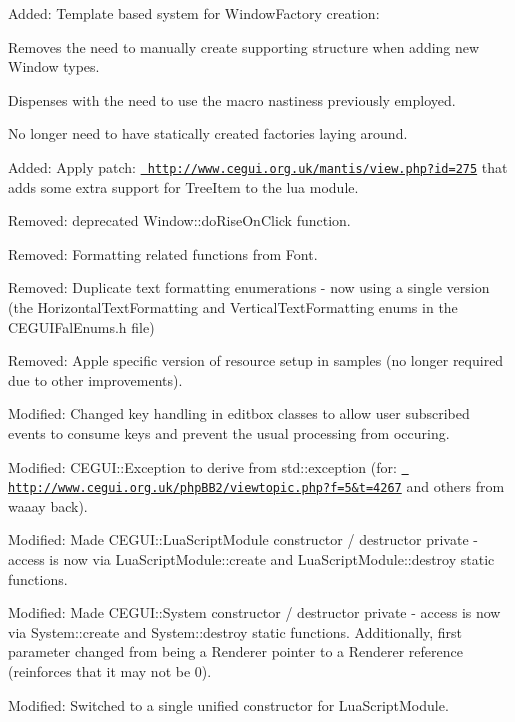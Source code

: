 \begin{DoxyItemize}
\item Added\+: Template based system for Window\+Factory creation\+:
\begin{DoxyItemize}
\item Removes the need to manually create supporting structure when adding new Window types.
\item Dispenses with the need to use the macro nastiness previously employed.
\item No longer need to have statically created factories laying around.
\end{DoxyItemize}
\item Added\+: Apply patch\+: \href{http://www.cegui.org.uk/mantis/view.php?id=275}{\texttt{ http\+://www.\+cegui.\+org.\+uk/mantis/view.\+php?id=275}} that adds some extra support for Tree\+Item to the lua module.
\item Removed\+: deprecated Window\+::do\+Rise\+On\+Click function.
\item Removed\+: Formatting related functions from Font.
\item Removed\+: Duplicate text formatting enumerations -\/ now using a single version (the Horizontal\+Text\+Formatting and Vertical\+Text\+Formatting enums in the C\+E\+G\+U\+I\+Fal\+Enums.\+h file)
\item Removed\+: Apple specific version of resource setup in samples (no longer required due to other improvements).
\item Modified\+: Changed key handling in editbox classes to allow user subscribed events to \textquotesingle{}consume\textquotesingle{} keys and prevent the usual processing from occuring.
\item Modified\+: C\+E\+G\+U\+I\+::\+Exception to derive from std\+::exception (for\+: \href{http://www.cegui.org.uk/phpBB2/viewtopic.php?f=5&t=4267}{\texttt{ http\+://www.\+cegui.\+org.\+uk/php\+B\+B2/viewtopic.\+php?f=5\&t=4267}} and others from waaay back).
\item Modified\+: Made C\+E\+G\+U\+I\+::\+Lua\+Script\+Module constructor / destructor private -\/ access is now via Lua\+Script\+Module\+::create and Lua\+Script\+Module\+::destroy static functions.
\item Modified\+: Made C\+E\+G\+U\+I\+::\+System constructor / destructor private -\/ access is now via System\+::create and System\+::destroy static functions. Additionally, first parameter changed from being a Renderer pointer to a Renderer reference (reinforces that it may not be 0).
\item Modified\+: Switched to a single unified constructor for Lua\+Script\+Module.

\end{DoxyItemize}
